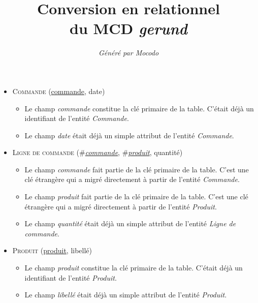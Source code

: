 \documentclass[a4paper]{article}
\title{Conversion en relationnel\\du MCD \emph{gerund}}
\author{\emph{Généré par Mocodo}}
\newcommand{\relat}[1]{\textsc{#1}}
\newcommand{\attr}[1]{#1}
\newcommand{\prim}[1]{\uline{#1}}
\newcommand{\foreign}[1]{\#\textsl{#1}}
\begin{document}
\maketitle

\begin{itemize}
  \item \relat{Commande} (\prim{commande}, \attr{date})
  \begin{itemize}
    \item Le champ \emph{commande} constitue la clé primaire de la table. C'était déjà un identifiant de l'entité \emph{Commande}.
    \item Le champ \emph{date} était déjà un simple attribut de l'entité \emph{Commande}.
  \end{itemize}

  \item \relat{Ligne de commande} (\foreign{\prim{commande}}, \foreign{\prim{produit}}, \attr{quantité})
  \begin{itemize}
    \item Le champ \emph{commande} fait partie de la clé primaire de la table. C'est une clé étrangère qui a migré directement à partir de l'entité \emph{Commande}.
    \item Le champ \emph{produit} fait partie de la clé primaire de la table. C'est une clé étrangère qui a migré directement à partir de l'entité \emph{Produit}.
    \item Le champ \emph{quantité} était déjà un simple attribut de l'entité \emph{Ligne de commande}.
  \end{itemize}

  \item \relat{Produit} (\prim{produit}, \attr{libellé})
  \begin{itemize}
    \item Le champ \emph{produit} constitue la clé primaire de la table. C'était déjà un identifiant de l'entité \emph{Produit}.
    \item Le champ \emph{libellé} était déjà un simple attribut de l'entité \emph{Produit}.
  \end{itemize}

\end{itemize}
\end{document}
